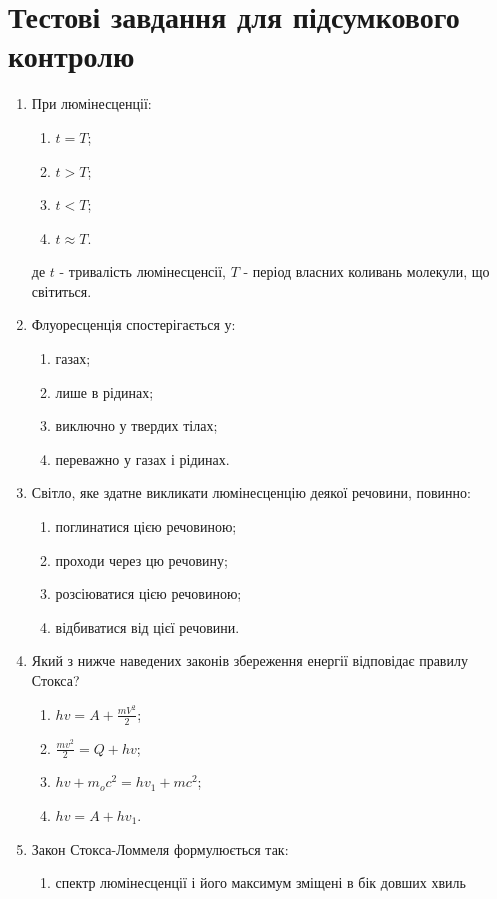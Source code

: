 \documentclass[twocolumn]{el-author}
\begin{document}
\section{Тестові завдання для підсумкового контролю}

\begin{enumerate}
	\item При люмінесценції:
	\begin{enumerate}
		\item $t = T$;
		\item $t > T$;
		\item $t < T$;
		\item $t \approx T$.
	\end{enumerate}
	де $t$ - тривалість люмінесценсії, $T$ - період власних коливань молекули, що
світиться.
	\item Флуоресценція спостерігається у:
	\begin{enumerate}
		\item газах;
		\item лише в рідинах;
		\item виключно у твердих тілах;
		\item переважно у газах і рідинах.
	\end{enumerate}
	\item Світло, яке здатне викликати люмінесценцію деякої речовини, повинно:
	\begin{enumerate}
		\item поглинатися цією речовиною;
		\item проходи через цю речовину;
		\item розсіюватися цією речовиною;
		\item відбиватися від цієї речовини.
	\end{enumerate}
	\item Який з нижче наведених законів збереження енергії відповідає правилу
Стокса?
	\begin{enumerate}
		\item $hv = A + \frac{mV^{2}}{2}$;
		\item $\frac{mv^{2}}{2} = Q + hv$;
		\item $hv + m_{o}c^{2} = hv_{1} + mc^{2}$;
		\item $hv = A + hv_{1}$.
	\end{enumerate}
	\item Закон Стокса-Ломмеля формулюється так:
	\begin{enumerate}
		\item спектр люмінесценції і його максимум зміщені в бік довших хвиль

\end{enumerate}
\end{enumerate}
\end{document}
